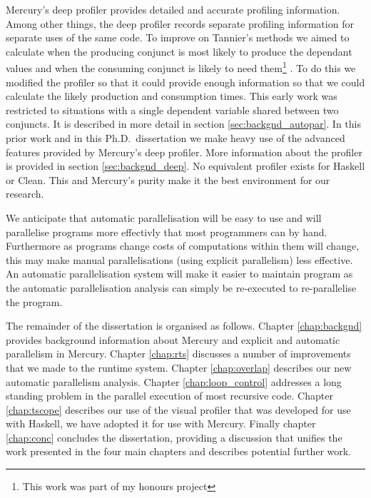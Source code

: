Mercury's deep profiler \citep{conway:2001:mercury-deep} provides
detailed and accurate profiling information.
Among other things,
the deep profiler records separate profiling information for separate
uses of the same code.
To improve on Tannier's methods we aimed to calculate when the
producing conjunct is most likely to produce the dependant values and
when the consuming conjunct is likely to need them\footnote{
    This work was part of my honours project}
\citep{bone:2008:hons}.
To do this we modified the profiler so that it could provide enough
information so that we could calculate the likely production and
consumption times.
This early work was restricted to situations with a
single dependent variable shared between two conjuncts.
It is described in more detail in section \ref{sec:backgnd_autopar}.
In this prior work and in this Ph.D.\ dissertation we make heavy use of the
advanced features provided by Mercury's deep profiler.
More information about the profiler is provided in section
\ref{sec:backgnd_deep}.
No equivalent profiler exists for Haskell or Clean.
This and Mercury's purity make it the best environment for our research.

We anticipate that automatic parallelisation will be easy to use and
will parallelise programs more effectivly that most programmers can by
hand.
Furthermore as programs change costs of computations within them will 
change,
this may make manual parallelisations (using explicit parallelism) less
effective.
An automatic parallelisation system will make it easier to maintain
program as the automatic parallelisation analysis can simply be
re-executed to re-parallelise the program.

The remainder of the dissertation is organised as follows.
Chapter \ref{chap:backgnd} provides background information about
Mercury and explicit and automatic parallelism in Mercury.
Chapter \ref{chap:rts} discusses a number of improvements that we made to
the runtime system.
Chapter \ref{chap:overlap} describes our new automatic parallelism
analysis.
Chapter \ref{chap:loop_control} addresses a long standing problem in the
parallel execution of most recursive code.
Chapter \ref{chap:tscope} describes our use of the \tscope visual
profiler that was developed for use with Haskell,
we have adopted it for use with Mercury.
Finally chapter \ref{chap:conc} concludes the dissertation, providing a
discussion that unifies the work presented in the four main chapters and
describes potential further work.


